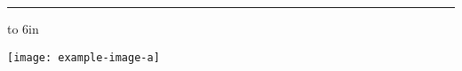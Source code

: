 \rule{6in}{0.0125in}
\vfill

\hbox to 6in{
  \begin{center}
    \texttt{[image: example-image-a]}
  \end{center}
}

\vfill
